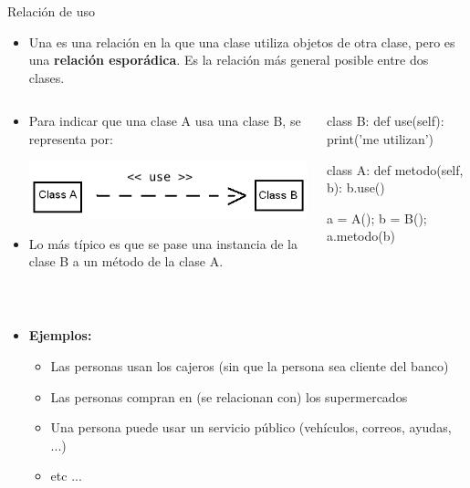 \documentclass[10pt,envcountsect,spanish]{beamer}
\begin{document}
\begin{frame}[fragile]{Relación de uso} 

\begin{itemize}
\item Una  es una relación en la que una clase utiliza objetos de otra clase, pero es una \textbf{relación esporádica}. Es la relación más general posible entre dos clases.
\end{itemize}

\begin{columns}
\begin{column}{.49\textwidth}
\begin{itemize}
\item Para indicar que una clase A usa una clase B, se representa por:
\centerline{\includegraphics[width=.8\textwidth]{fig/usaUML}}

\item Lo más típico es que se pase una instancia de la clase B a un método de la clase A.

\end{itemize}

\end{column}
\begin{column}{.41\textwidth}
 \scriptsize
\begin{pyconsole}[][frame=single]
class B:
    def use(self):
        print('me utilizan')
        
class A:
    def metodo(self, b):
        b.use()
        
a = A(); b = B(); a.metodo(b)

\end{pyconsole}

\end{column}
\end{columns}

\

\begin{itemize}
\item \textbf{Ejemplos:} \it \small
\begin{itemize}
\item Las personas usan los cajeros (sin que la persona sea cliente del banco)

\item Las personas compran en (se relacionan con) los supermercados

\item Una persona puede usar un servicio público (vehículos, correos, ayudas, ...)

\item etc ...
\end{itemize}

\end{itemize}



\end{frame}
\end{document}
